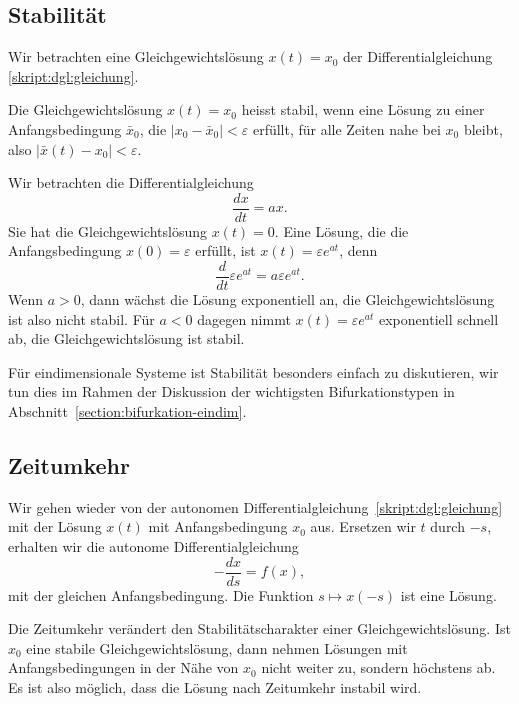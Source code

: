 \subsection{Stabilität}
Wir betrachten eine Gleichgewichtslösung $x(t)=x_0$ der Differentialgleichung
\eqref{skript:dgl:gleichung}.
\begin{definition}
Die Gleichgewichtslösung $x(t)=x_0$ heisst stabil, wenn eine Lösung zu
einer Anfangsbedingung $\bar x_0$, die $|x_0-\bar x_0|<\varepsilon$
erfüllt, für alle Zeiten nahe bei $x_0$ bleibt, also
$|\bar x(t)- x_0|<\varepsilon$.
\end{definition}
%

\begin{beispiel}
Wir betrachten die Differentialgleichung
\[
\frac{dx}{dt} = ax.
\]
Sie hat die Gleichgewichtslösung $x(t)=0$.
Eine Lösung, die die Anfangsbedingung $x(0)=\varepsilon$ erfüllt, 
ist $x(t)=\varepsilon e^{at}$, denn
\[
\frac{d}{dt}
\varepsilon e^{at}
=
a\varepsilon e^{at}.
\]
Wenn $a>0$, dann wächst die Lösung exponentiell an, die Gleichgewichtslösung 
ist also nicht stabil.
Für $a<0$ dagegen nimmt $x(t)=\varepsilon e^{at}$ exponentiell schnell ab,
die Gleichgewichtslösung ist stabil.
\end{beispiel}

Für eindimensionale Systeme ist Stabilität besonders einfach zu
diskutieren, wir tun dies im Rahmen der Diskussion der wichtigsten
Bifurkationstypen in Abschnitt~\ref{section:bifurkation-eindim}.

\subsection{Zeitumkehr}
%
Wir gehen wieder von der autonomen
Differentialgleichung~\eqref{skript:dgl:gleichung}
mit der Lösung $x(t)$ mit Anfangsbedingung $x_0$ aus.
Ersetzen wir $t$ durch $-s$, erhalten wir die autonome Differentialgleichung
\begin{equation}
-\frac{dx}{ds}
=
f(x),
\end{equation}
mit der gleichen Anfangsbedingung.
Die Funktion $s\mapsto x(-s)$ ist eine Lösung.

Die Zeitumkehr verändert den Stabilitätscharakter einer Gleichgewichtslösung.
Ist $x_0$ eine stabile Gleichgewichtslösung, dann nehmen Lösungen mit
Anfangsbedingungen in der Nähe von $x_0$ nicht weiter zu, sondern
höchstens ab.
Es ist also möglich, dass die Lösung nach Zeitumkehr instabil wird.

